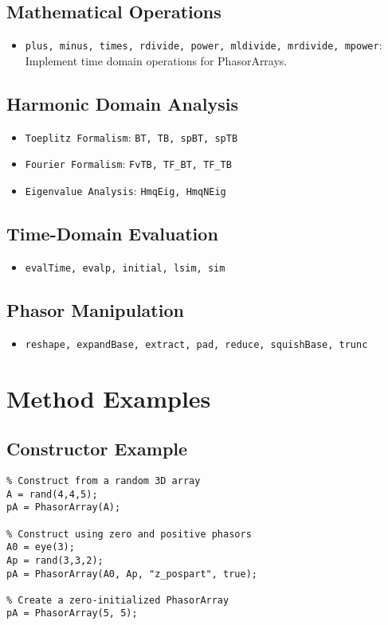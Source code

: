 \subsection{Mathematical Operations}
\begin{itemize}
    \item \texttt{plus, minus, times, rdivide, power, mldivide, mrdivide, mpower}: Implement time domain operations for PhasorArrays.
\end{itemize}

\subsection{Harmonic Domain Analysis}
\begin{itemize}
    \item \texttt{Toeplitz Formalism}: \texttt{BT, TB, spBT, spTB}
    \item \texttt{Fourier Formalism}: \texttt{FvTB, TF\_BT, TF\_TB}
    \item \texttt{Eigenvalue Analysis}: \texttt{HmqEig, HmqNEig}
\end{itemize}

\subsection{Time-Domain Evaluation}
\begin{itemize}
    \item \texttt{evalTime, evalp, initial, lsim, sim}
\end{itemize}

\subsection{Phasor Manipulation}
\begin{itemize}
    \item \texttt{reshape, expandBase, extract, pad, reduce, squishBase, trunc}
\end{itemize}

\section{Method Examples}
\subsection{Constructor Example}
\begin{verbatim}
% Construct from a random 3D array
A = rand(4,4,5); 
pA = PhasorArray(A);

% Construct using zero and positive phasors
A0 = eye(3); 
Ap = rand(3,3,2); 
pA = PhasorArray(A0, Ap, "z_pospart", true);

% Create a zero-initialized PhasorArray
pA = PhasorArray(5, 5);
\end{verbatim}

